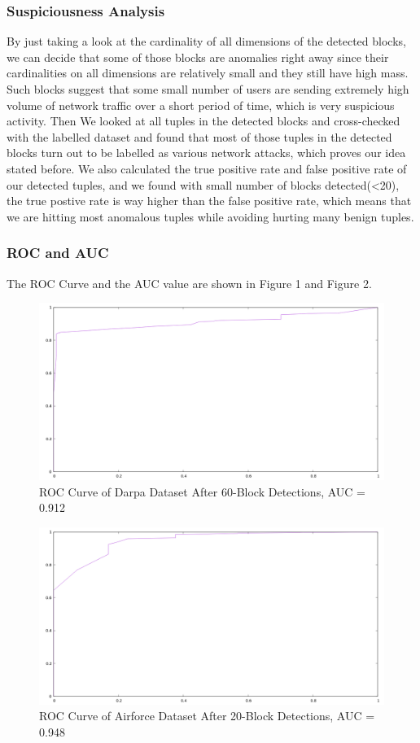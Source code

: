 \subsubsection{Suspiciousness Analysis}
By just taking a look at the cardinality of all dimensions of the detected blocks, we can decide that some of those blocks are
anomalies right away since their cardinalities on all dimensions are relatively small and they still have high mass. Such blocks
suggest that some small number of users are sending extremely high volume of network traffic over a short period of time, which is very
suspicious activity.
Then We looked at all tuples in the detected blocks and cross-checked with the labelled dataset and found that most of those tuples in
the detected blocks turn out to be labelled as various network attacks, which proves our idea stated before. We also calculated
the true positive rate and false positive rate of our detected tuples, and we found with small number of blocks detected(<20), the true
postive rate is way higher than the false positive rate, which means that we are hitting most anomalous tuples while avoiding hurting many
benign tuples.

\subsubsection{ROC and AUC}
The ROC Curve and the AUC value are shown in Figure 1 and Figure 2.
\begin{figure}
\includegraphics[scale=0.5]{roc1.png}
\caption{ROC Curve of Darpa Dataset After 60-Block Detections, AUC = 0.912}
\end{figure}

\begin{figure}
\includegraphics[scale=0.5]{roc2.png}
\caption{ROC Curve of Airforce Dataset After 20-Block Detections, AUC = 0.948}
\end{figure}
